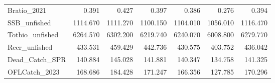 \documentclass[
  english,
  a4paper,
]{article}
\begin{document}
\begin{table}
{\begin{tabular}[t]{lrrrrrr}
Bratio\_2021 & 0.391 & 0.427 & 0.397 & 0.386 & 0.276 & 0.394\\
SSB\_unfished & 1114.670 & 1111.270 & 1100.150 & 1104.010 & 1056.010 & 1116.470\\
Totbio\_unfished & 6264.570 & 6302.200 & 6219.740 & 6240.070 & 6008.800 & 6279.770\\
Recr\_unfished & 433.531 & 459.429 & 442.736 & 430.575 & 403.752 & 436.042\\
Dead\_Catch\_SPR & 140.884 & 145.028 & 141.881 & 140.347 & 134.758 & 141.325\\
OFLCatch\_2023 & 168.686 & 184.428 & 171.247 & 166.356 & 127.785 & 170.296\\
\bottomrule
\end{tabular}}
\end{table}

\begin{table}


\end{table}
\end{document}
